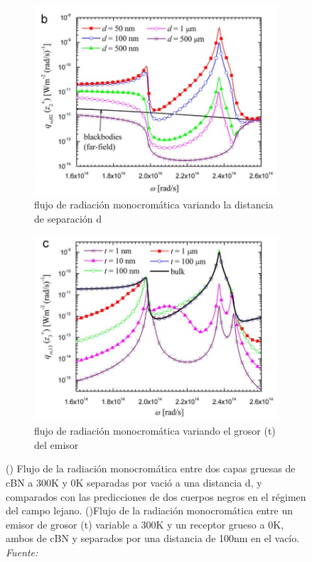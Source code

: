 \begin{figure}
\centering
\begin{subfigure}[b]{0.48\textwidth}
	\centering
		\includegraphics[width=\textwidth]{figuras/graficaDiff_dc_fullEqu.png}
		\caption{flujo de radiación monocromática variando la distancia de separación d}
	\label{fig:graficaDiff_dc_fullEqu}
\end{subfigure}
\begin{subfigure}[b]{0.48\textwidth}
	\centering
		\includegraphics[width=\textwidth]{figuras/graficaDiff_t_fullEqu.png}
		\caption{flujo de radiación monocromática variando el grosor (t) del emisor}
	\label{fig:graficaDiff_t_fullEqu}
\end{subfigure}
\caption[Flujos de radiación monocromática por variación de grosor de emisor y variación de distancia]{() Flujo de la radiación monocromática entre dos capas gruesas de cBN a 300K y 0K separadas por vació a una distancia d, y comparados con las predicciones de dos cuerpos negros en el régimen del campo lejano. ()Flujo de la radiación monocromática entre un emisor de grosor (t) variable a 300K y un receptor grueso a 0K, ambos de cBN y separados por una distancia de 100nm en el vacío. \textit{Fuente: \cite{nfTPV_fullEquations}}}%
\label{fig:graficas_fullEqu}%
\end{figure}

